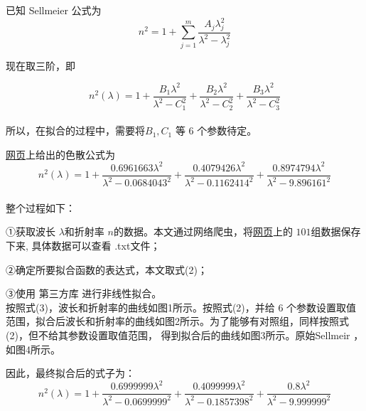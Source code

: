 \documentclass[12pt, a4paper, oneside]{ctexart}
\begin{document}
已知 Sellmeier 公式为
\begin{equation}
n^{2} = 1 + \sum_{j=1}^{m}\frac{A_{j}\lambda _{j}^{2}}{\lambda^{2}-\lambda _{j}^{2} }
\end{equation}

现在取三阶，即

\begin{equation}
    n^{2}(\lambda) = 1 + \frac{B_1 \lambda^2}{\lambda^2 - C_1^2} + \frac{B_2 \lambda^2}{\lambda^2 - C_2^2}
+ \frac{B_3 \lambda^2}{\lambda^2 - C_3^2}
\end{equation}\\
所以，在拟合的过程中，需要将$B_1,C_1$ 等 6 个参数待定。

\href{https://refractiveindex.info/?shelf=main&book=SiO2&page=Malitson}{网页}上给出的色散公式为
\begin{equation}
    n^{2}(\lambda) = 1 + \frac{0.6961663 \lambda^2}{\lambda^2 - 0.0684043^2} + \frac{0.4079426 \lambda^2}{\lambda^2 - 0.1162414^2}
+ \frac{0.8974794 \lambda^2}{\lambda^2 - 9.896161^2}
\end{equation}
\\

整个过程如下：

①获取波长 \@$\lambda$\@ 和折射率 \@$n$\@ 的数据。本文通过网络爬虫，将\href{https://refractiveindex.info/?shelf=main&book=SiO2&page=Malitson}{网页}上的 \@$101$\@ 组数据保存下来,
具体数据可以查看 \@data.txt\@ 文件；

②确定所要拟合函数的表达式，本文取式(2)；

③使用 \@python\@ 第三方库 \@scipy\@ 进行非线性拟合。
\\

按照式(3)，波长和折射率的曲线如图\@ 1所示。按照式(2)，并给 6 个参数设置取值范围，拟合后波长和折射率的曲线如图\@ 2所示。为了能够有对照组，同样按照式(2)，但不给其参数设置取值范围，
得到拟合后的曲线如图\@ 3所示。原始\@ Sellmeir ，如图\@ 4所示。

因此，最终拟合后的式子为：
\begin{equation}
    n^{2}(\lambda) = 1 + \frac{0.6999999 \lambda^2}{\lambda^2 - 0.0699999^2} + \frac{0.4099999 \lambda^2}{\lambda^2 - 0.1857398^2}
+ \frac{0.8 \lambda^2}{\lambda^2 - 9.999999^2}
\end{equation}
\end{document}
